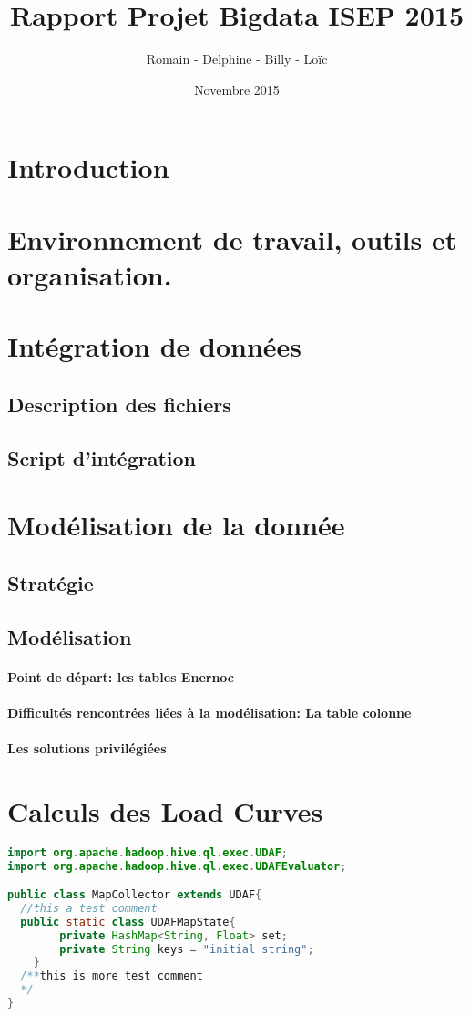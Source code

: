 \documentclass{report}
\title{Rapport Projet Bigdata ISEP 2015}
\author{Romain - Delphine - Billy - Loïc}
\date{Novembre 2015}
\begin{document}


\maketitle

\tableofcontents

\newpage

\section{Introduction}
\section{Environnement de travail, outils et organisation.}
\section{Intégration de données}
\subsection{Description des fichiers}
\subsection{Script d’intégration}
\section{Modélisation de la donnée}
\subsection{Stratégie}
\subsection{Modélisation}
\paragraph{Point de départ: les tables Enernoc}
\paragraph{Difficultés rencontrées liées à la modélisation: La table colonne}
\paragraph{Les solutions privilégiées}
\section{Calculs des Load Curves}

\begin{lstlisting}[language=java]
import org.apache.hadoop.hive.ql.exec.UDAF;
import org.apache.hadoop.hive.ql.exec.UDAFEvaluator;

public class MapCollector extends UDAF{
  //this a test comment
  public static class UDAFMapState{
		private HashMap<String, Float> set;
		private String keys = "initial string";
	}
  /**this is more test comment
  */
}
\end{lstlisting}
\end{document}

